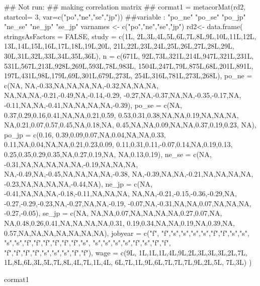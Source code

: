 \documentclass[a4paper]{book}
\begin{document}
\begin{Examples}
\begin{ExampleCode}
\#\# Not run: 
## making correlation matrix ##
cormat1 = metacorMat(rd2, startcol= 3, var=c("po","ne","se","jp"))
 ##variable : "po_ne" "po_se" "po_jp" "ne_se" "ne_jp" "se_jp"
 varnames <- c("po","ne","se","jp")
rd2<- data.frame(
  stringsAsFactors = FALSE,
  study = c(1L,
            2L,3L,4L,5L,6L,7L,8L,9L,10L,11L,12L,
            13L,14L,15L,16L,17L,18L,19L,20L,
            21L,22L,23L,24L,25L,26L,27L,28L,29L,
            30L,31L,32L,33L,34L,35L,36L),
  n = c(671L,
        92L,73L,321L,214L,947L,321L,231L,
        531L,567L,213L,928L,269L,593L,78L,983L,
        1504L,247L,79L,875L,68L,201L,891L,
        197L,431L,98L,179L,69L,301L,679L,273L,
        254L,316L,781L,273L,268L),
  po_ne = c(NA,
            NA,-0.33,NA,NA,NA,NA,-0.32,NA,NA,NA,
            NA,NA,NA,-0.21,-0.49,NA,-0.14,-0.29,
            -0.27,NA,-0.37,NA,NA,-0.35,-0.17,NA,
            -0.11,NA,NA,-0.41,NA,NA,NA,NA,-0.39),
  po_se = c(NA,
            0.37,0.29,0.16,0.41,NA,NA,0.21,0.59,
            0.53,0.31,0.38,NA,NA,0.19,NA,NA,NA,
            NA,0.21,0.07,0.57,0.45,NA,0.18,NA,
            0.45,NA,NA,0.09,NA,NA,0.37,0.19,0.23,
            NA),
  po_jp = c(0.16,
            0.39,0.09,0.07,NA,0.04,NA,NA,0.33,
            0.11,NA,0.04,NA,NA,0.21,0.23,0.09,
            0.11,0.31,0.11,-0.07,0.14,NA,0.19,0.13,
            0.25,0.35,0.29,0.35,NA,0.27,0.19,NA,
            NA,0.13,0.19),
  ne_se = c(NA,
            -0.31,NA,NA,NA,NA,NA,-0.19,NA,NA,NA,
            NA,-0.49,NA,-0.45,NA,NA,NA,NA,-0.38,
            NA,-0.39,NA,NA,-0.21,NA,NA,NA,NA,
            -0.23,NA,NA,NA,NA,-0.44,NA),
  ne_jp = c(NA,
            -0.41,NA,NA,NA,-0.18,-0.11,NA,NA,NA,
            NA,NA,-0.21,-0.15,-0.36,-0.29,NA,
            -0.27,-0.29,-0.23,NA,-0.27,NA,NA,-0.19,
            -0.07,NA,-0.31,NA,NA,0.07,NA,NA,NA,
            -0.27,-0.05),
  se_jp = c(NA,
            NA,NA,0.07,NA,NA,NA,NA,0.27,0.07,NA,
            NA,0.48,0.26,0.41,NA,NA,NA,NA,0.31,
            0.19,0.34,NA,NA,0.19,NA,0.39,NA,
            0.57,NA,NA,NA,NA,NA,NA,NA),
  jobyear = c("f",
              "f","s","s","s","s","f","f","s","s",
              "s","s","f","f","f","f","f","f","s",
              "s","s","s","s","f","s","f","f",
              "f","f","f","f","s","s","s","f","f"),
  wage = c(9L,
           1L,1L,1L,4L,9L,2L,3L,3L,3L,2L,7L,
           1L,8L,6L,3L,5L,7L,8L,4L,7L,1L,4L,
           6L,7L,1L,9L,6L,7L,7L,7L,9L,2L,5L,
           7L,3L)
)

cormat1



\end{ExampleCode}
\end{Examples}
\end{document}
